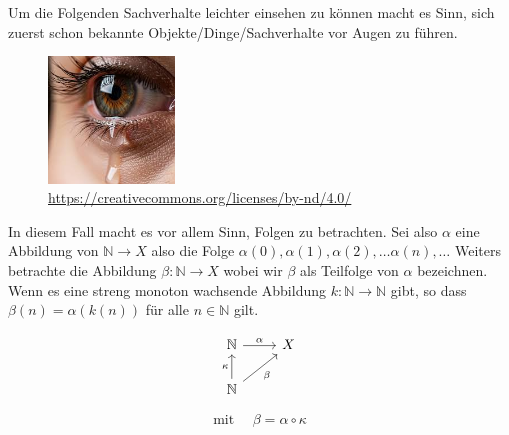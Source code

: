 \chapter{}

Um die Folgenden Sachverhalte leichter einsehen zu können macht es Sinn,
sich zuerst schon bekannte Objekte/Dinge/Sachverhalte vor Augen zu führen.
\begin{figure}[h!]
 \centering
    \includegraphics[width=0.3\textwidth]{pictures/Auge.jpeg}
    \caption{\url{https://creativecommons.org/licenses/by-nd/4.0/}}
 \end{figure}

In diesem Fall macht es vor allem Sinn, Folgen zu betrachten.
Sei also $\alpha$ eine Abbildung von $\mathbb{N} \to X$ 
also die Folge $\alpha(0), \alpha(1), \alpha(2), \dots \alpha(n), \dots $
Weiters betrachte die Abbildung $\beta: \mathbb{N} \to X$
wobei wir $\beta$ als Teilfolge von $\alpha$ bezeichnen. Wenn es eine streng
monoton wachsende Abbildung $k: \mathbb{N} \to \mathbb{N}$ gibt, so dass
$\beta(n) = \alpha(k(n))$ für alle $n \in \mathbb{N}$ gilt.

$$
\begin{tikzcd}
\mathbb{N} \arrow[r, "\alpha"]  & X \\
\mathbb{N} \arrow[ur, "\beta"'] \arrow["\kappa", u] &
\end{tikzcd}
$$

$$
\text{mit } \quad \beta = \alpha \circ \kappa
$$

